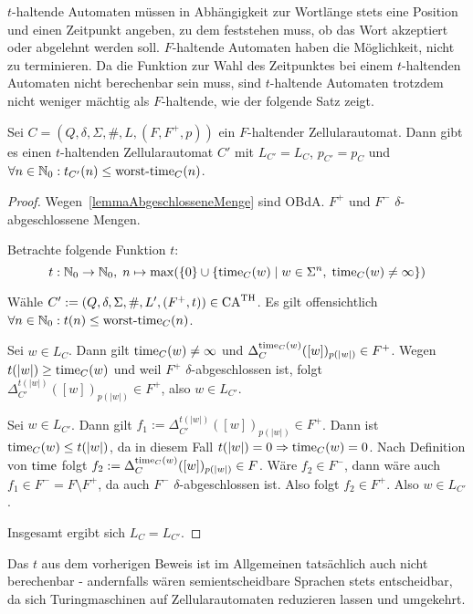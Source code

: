 $t$-haltende Automaten müssen in Abhängigkeit zur Wortlänge stets eine Position und einen Zeitpunkt angeben,
zu dem feststehen muss, ob das Wort akzeptiert oder abgelehnt werden soll.
$F$-haltende Automaten haben die Möglichkeit, nicht zu terminieren.
Da die Funktion zur Wahl des Zeitpunktes bei einem $t$-haltenden Automaten nicht berechenbar sein muss,
sind $t$-haltende Automaten trotzdem nicht weniger mächtig als $F$-haltende, wie der folgende Satz zeigt.

\begin{satz}
    Sei $C = (Q, \delta, \Sigma, \#, L, (F, F^+, p))$ ein $F$-haltender Zellularautomat.
    Dann gibt es einen $t$-haltenden Zellularautomat $C'$ mit $L_{C'} = L_C$, $p_{C'} = p_C$ und $\forall n \in \mathbb{N}_0: t_{C'}(n) \leq \operatorname{worst-time}_C(n)$.
\end{satz}
\begin{proof}
    Wegen~\cref{lemmaAbgeschlosseneMenge} sind \acs{OBdA.} $F^+$ und $F^-$ $\delta$-abgeschlossene Mengen.
    
    Betrachte folgende Funktion $t$:
    \[
        t: \mathbb{N}_0 \to \mathbb{N}_0, \; n \mapsto \max(\{ { 0 } \} \cup \{ { \operatorname{time}_C(w) } \; | \; { w \in \Sigma^n, \; \operatorname{time}_C(w) \neq \infty } \})
    \]

    Wähle $C' := (Q, \delta, \Sigma, \#, L', (F^+, t)) \in \textrm{CA}^{\textrm{TH}}$.
    Es gilt offensichtlich $\forall n \in \mathbb{N}_0: t(n) \leq \operatorname{worst-time}_C(n)$.
    
    Sei $w \in L_C$. Dann gilt $\operatorname{time}_C(w) \neq \infty$ und $\Delta_{C}^{\operatorname{time}_C(w)}([w])_{p(|w|)} \in F^+$.
    Wegen $t(|w|) \geq \operatorname{time}_C(w)$ und weil $F^+$ $\delta$-abgeschlossen ist, folgt $\Delta_{C'}^{t(|w|)}([w])_{p(|w|)} \in F^+$,
    also $w \in L_{C'}$.
    
    Sei $w \in L_{C'}$. Dann gilt $f_1 := \Delta_{C'}^{t(|w|)}([w])_{p(|w|)} \in F^+$.
    Dann ist $\operatorname{time}_C(w) \leq t(|w|)$, da in diesem Fall $t(|w|) = 0 \Rightarrow \operatorname{time}_C(w) = 0$.
    Nach Definition von $\operatorname{time}$ folgt $f_2 := \Delta_{C}^{\operatorname{time}_C(w)}([w])_{p(|w|)} \in F$.
    Wäre $f_2 \in F^-$, dann wäre auch $f_1 \in F^- = F \setminus F^+$, da auch $F^-$ $\delta$-abgeschlossen ist.
    Also folgt $f_2 \in F^+$. Also $w \in L_{C'}$.
    
    Insgesamt ergibt sich $L_C = L_{C'}$.
\end{proof}

\begin{remark}
    Das $t$ aus dem vorherigen Beweis ist im Allgemeinen tatsächlich auch nicht berechenbar - andernfalls
    wären semientscheidbare Sprachen stets entscheidbar, da sich Turingmaschinen auf Zellularautomaten reduzieren lassen und umgekehrt.
\end{remark}

